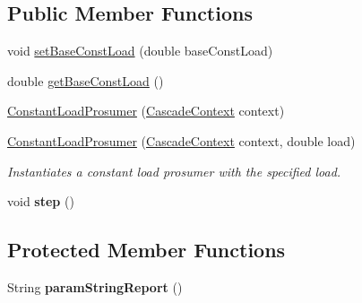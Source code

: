 \subsection*{Public Member Functions}
\begin{DoxyCompactItemize}
\item 
void \hyperlink{classuk_1_1ac_1_1dmu_1_1iesd_1_1cascade_1_1agents_1_1prosumers_1_1_constant_load_prosumer_af1dddbdd2c0a03d5bdb159a35847de52}{set\-Base\-Const\-Load} (double base\-Const\-Load)
\item 
double \hyperlink{classuk_1_1ac_1_1dmu_1_1iesd_1_1cascade_1_1agents_1_1prosumers_1_1_constant_load_prosumer_abf38d7e3ac0aef6e3376ad59f8be54cf}{get\-Base\-Const\-Load} ()
\item 
\hyperlink{classuk_1_1ac_1_1dmu_1_1iesd_1_1cascade_1_1agents_1_1prosumers_1_1_constant_load_prosumer_acd342db749e0a739926f0076fcb70cd7}{Constant\-Load\-Prosumer} (\hyperlink{classuk_1_1ac_1_1dmu_1_1iesd_1_1cascade_1_1context_1_1_cascade_context}{Cascade\-Context} context)
\item 
\hyperlink{classuk_1_1ac_1_1dmu_1_1iesd_1_1cascade_1_1agents_1_1prosumers_1_1_constant_load_prosumer_a978ee3b921a2ee7a1677464adc0ea52e}{Constant\-Load\-Prosumer} (\hyperlink{classuk_1_1ac_1_1dmu_1_1iesd_1_1cascade_1_1context_1_1_cascade_context}{Cascade\-Context} context, double load)
\begin{DoxyCompactList}\small\item\em Instantiates a constant load prosumer with the specified load. \end{DoxyCompactList}\item 
\hypertarget{classuk_1_1ac_1_1dmu_1_1iesd_1_1cascade_1_1agents_1_1prosumers_1_1_constant_load_prosumer_a803e5f1371a9e6f325d5ae5baa4c0730}{void {\bfseries step} ()}\label{classuk_1_1ac_1_1dmu_1_1iesd_1_1cascade_1_1agents_1_1prosumers_1_1_constant_load_prosumer_a803e5f1371a9e6f325d5ae5baa4c0730}

\end{DoxyCompactItemize}
\subsection*{Protected Member Functions}
\begin{DoxyCompactItemize}
\item 
\hypertarget{classuk_1_1ac_1_1dmu_1_1iesd_1_1cascade_1_1agents_1_1prosumers_1_1_constant_load_prosumer_a36bcd0e7f49c54e07afc61e7be7556f3}{String {\bfseries param\-String\-Report} ()}\label{classuk_1_1ac_1_1dmu_1_1iesd_1_1cascade_1_1agents_1_1prosumers_1_1_constant_load_prosumer_a36bcd0e7f49c54e07afc61e7be7556f3}

\end{DoxyCompactItemize}
